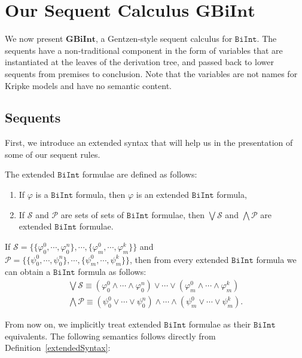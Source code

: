 \documentclass{llncs}
\numberwithin{equation}{section}
\newcommand{\Pred}{{\mathcal{P}}}
\newcommand{\Succ}{{\mathcal{S}}}
\newcommand{\Lg}[1]{\mathtt{#1}}
\newcommand{\ExAnd}{\wedge}
\newcommand{\ExOr}{\vee}
\newcommand {\BiInt}{
        \Lg{BiInt}
}
\newcommand{\GBiInt}{\mathbf{GBiInt}}
\begin{document}
\section{Our Sequent Calculus $\GBiInt$}\label{ourCalculus}

We now present $\GBiInt$, a Gentzen-style sequent calculus for $\BiInt$. The sequents have a non-traditional component in the form of variables that are instantiated at the leaves of the derivation tree, and passed back to lower sequents from premises to conclusion. Note that the variables are not names for Kripke models and have no semantic content.

\subsection{Sequents}

First, we introduce an extended syntax that will help us in the presentation of some of our sequent rules.

\begin{definition}\label{extendedSyntax}
The extended $\BiInt$ formulae are defined as follows:
\begin{enumerate}
	\item If $\varphi$ is a $\BiInt$ formula, then $\varphi$ is an extended $\BiInt$ formula,
	\item If $\Succ$ and $\Pred$ are sets of sets of $\BiInt$ formulae, then $\bigvee \Succ$ and $\bigwedge \Pred$ are extended $\BiInt$ formulae.
\end{enumerate}
If $ \Succ = \{ \{ \varphi_0^0, \cdots, \varphi_0^n \}, \cdots, \{ \varphi_m^0, \cdots, \varphi_m^k \} \}$ and \\ $\Pred = \{ \{ \psi_0^0, \cdots, \psi_0^n \}, \cdots, \{ \psi_m^0, \cdots, \psi_m^k \} \}$, then from every extended $\BiInt$ formula we can obtain a $\BiInt$ formula as follows:
$$
\begin{array}{c}
\bigvee \Succ \equiv (\varphi_0^0 \ExAnd \cdots \ExAnd \varphi_0^n) \ExOr \cdots \ExOr (\varphi_m^0 \ExAnd \cdots \ExAnd \varphi_m^k) \\
\bigwedge \Pred \equiv (\psi_0^0 \ExOr \cdots \ExOr \psi_0^n) \ExAnd \cdots \ExAnd  (\psi_m^0 \ExOr \cdots \ExOr \psi_m^k).
\end{array}
$$
\end{definition}

From now on,  we implicitly treat extended $\BiInt$ formulae as their $\BiInt$ equivalents. The following semantics follows directly from Definition~\ref{extendedSyntax}:
\end{document}
